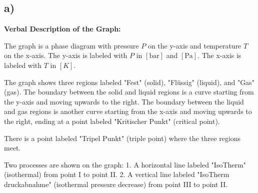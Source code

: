 

\subsection*{a)}

\begin{center}
\textbf{Verbal Description of the Graph:}

The graph is a phase diagram with pressure \( P \) on the y-axis and temperature \( T \) on the x-axis. The y-axis is labeled with \( P \) in \([ \text{bar} ]\) and \([ \text{Pa} ]\). The x-axis is labeled with \( T \) in \([ K ]\). 

The graph shows three regions labeled "Fest" (solid), "Flüssig" (liquid), and "Gas" (gas). The boundary between the solid and liquid regions is a curve starting from the y-axis and moving upwards to the right. The boundary between the liquid and gas regions is another curve starting from the x-axis and moving upwards to the right, ending at a point labeled "Kritischer Punkt" (critical point). 

There is a point labeled "Tripel Punkt" (triple point) where the three regions meet. 

Two processes are shown on the graph:
1. A horizontal line labeled "IsoTherm" (isothermal) from point I to point II.
2. A vertical line labeled "IsoTherm druckabnahme" (isothermal pressure decrease) from point III to point II.

\end{center}